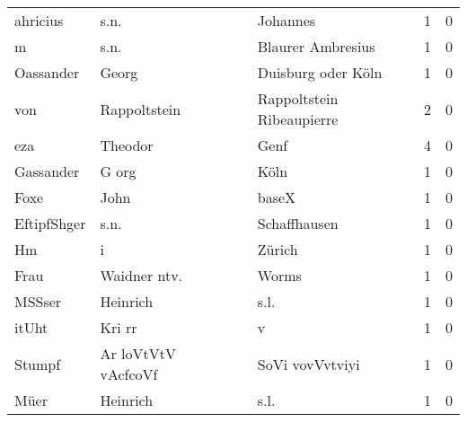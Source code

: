 \begin{tabular}{llllrr}
                 ahricius &                               s.n. &             &                                    Johannes &          1 &         0 \\
                        m &                               s.n. &             &                           Blaurer Ambresius &          1 &         0 \\
                Oassander &                              Georg &             &                          Duisburg oder Köln &          1 &         0 \\
                      von &                       Rappoltstein &             &                   Rappoltstein Ribeaupierre &          2 &         0 \\
                      eza &                            Theodor &             &                                        Genf &          4 &         0 \\
                Gassander &                              G org &             &                                        Köln &          1 &         0 \\
                     Foxe &                               John &             &                                       baseX &          1 &         0 \\
              EftipfShger &                               s.n. &             &                                Schaffhausen &          1 &         0 \\
                       Hm &                                  i &             &                                      Zürich &          1 &         0 \\
                     Frau &                       Waidner ntv. &             &                                       Worms &          1 &         0 \\
                   MSSser &                           Heinrich &             &                                        s.l. &          1 &         0 \\
                    itUht &                             Kri rr &             &                                           v &          1 &         0 \\
                   Stumpf &                Ar loVtVtV vAcfcoVf &             &                             SoVi vovVvtviyi &          1 &         0 \\
                     Müer &                           Heinrich &             &                                        s.l. &          1 &         0 \\

\end{tabular}
